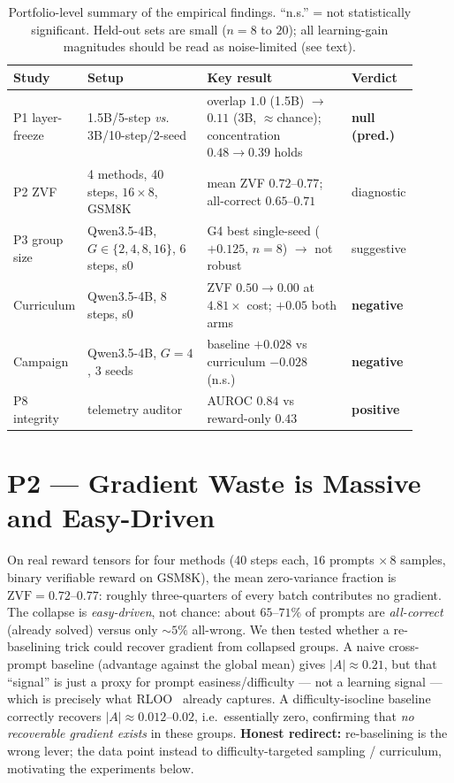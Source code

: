\documentclass[12pt,a4paper]{report}
\newcommand{\zvf}{\mathrm{ZVF}}
\begin{document}
\begin{table}[t]
\centering
\small
\begin{tabular}{@{}L{0.14\linewidth}L{0.30\linewidth}L{0.37\linewidth}L{0.10\linewidth}@{}}
\toprule
\textbf{Study} & \textbf{Setup} & \textbf{Key result} & \textbf{Verdict} \\
\midrule
P1 layer-freeze
& 1.5B/5-step \emph{vs.} 3B/10-step/2-seed
& overlap $1.0$ (1.5B) $\to$ $0.11$ (3B, ${\approx}$chance); concentration $0.48{\to}0.39$ holds
& \textbf{null (pred.)} \\
P2 ZVF
& 4 methods, 40 steps, $16\times8$, GSM8K
& mean ZVF $0.72$--$0.77$; all-correct $0.65$--$0.71$
& diagnostic \\
P3 group size
& Qwen3.5-4B, $G\in\{2,4,8,16\}$, 6 steps, s0
& G4 best single-seed ($+0.125$, $n{=}8$) $\to$ not robust
& suggestive \\
Curriculum
& Qwen3.5-4B, 8 steps, s0
& ZVF $0.50\to0.00$ at $4.81\times$ cost; $+0.05$ both arms
& \textbf{negative} \\
Campaign
& Qwen3.5-4B, $G{=}4$, 3 seeds
& baseline $+0.028$ vs curriculum $-0.028$ (n.s.)
& \textbf{negative} \\
P8 integrity
& telemetry auditor
& AUROC $0.84$ vs reward-only $0.43$
& \textbf{positive} \\
\bottomrule
\end{tabular}
\caption{Portfolio-level summary of the empirical findings. ``n.s.'' = not
statistically significant. Held-out sets are small ($n=8$ to $20$); all
learning-gain magnitudes should be read as noise-limited (see text).}
\label{tab:summary}
\end{table}

\section{P2 --- Gradient Waste is Massive and Easy-Driven}
On real reward tensors for four methods (40 steps each, $16$ prompts $\times\,8$
samples, binary verifiable reward on GSM8K), the mean zero-variance fraction is
$\zvf = 0.72$--$0.77$: roughly three-quarters of every batch contributes no
gradient. The collapse is \emph{easy-driven}, not chance: about $65$--$71\%$ of
prompts are \emph{all-correct} (already solved) versus only ${\sim}5\%$ all-wrong.
We then tested whether a re-baselining trick could recover gradient from collapsed
groups. A naive cross-prompt baseline (advantage against the global mean) gives
$|A|\approx0.21$, but that ``signal'' is just a proxy for prompt
easiness/difficulty --- not a learning signal --- which is precisely what
RLOO~\cite{ahmadian2024rloo} already captures. A difficulty-isocline baseline
correctly recovers $|A|\approx0.012$--$0.02$, i.e.\ essentially zero, confirming that
\emph{no recoverable gradient exists} in these groups. \textbf{Honest redirect:}
re-baselining is the wrong lever; the data point instead to difficulty-targeted
sampling / curriculum, motivating the experiments below.
\end{document}
